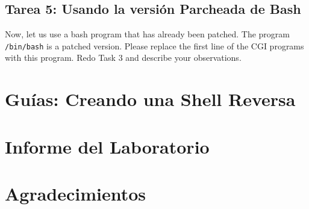\subsection{Tarea 5: Usando la versión Parcheada de Bash}

Now, let us use a bash program that has already been patched.
The program \texttt{/bin/bash} is a patched version.
Please replace the first line of 
the CGI programs with this program. 
Redo Task 3 and describe your observations. 


\section{Guías: Creando una Shell Reversa}
\label{shellshock:sec:reverseshell}






\section{Informe del Laboratorio}




\section*{Agradecimientos}






